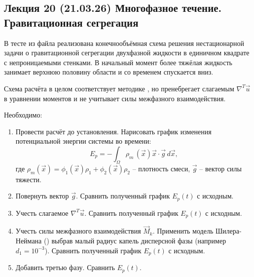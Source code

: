 \subsection{Лекция 20 (21.03.26) Многофазное течение. Гравитационная сегрегация}
В тесте \cvar{[gravity-mf]} из файла 
реализована конечнообъёмная схема решения нестационарной задачи
о гравитационной сегрегации двухфазной жидкости в единичном квадрате с непроницаемыми стенками.
В начальный момент более тяжёлая жидкость занимает верхнюю половину области и со временем спускается вниз.

Схема расчёта в целом соответствует методике , но пренебрегает слагаемым
$\nabla^T \vec u$ в уравнении моментов и не учитывает силы межфазного взаимодействия.

Необходимо:
\begin{enumerate}
\item  Провести расчёт до установления. Нарисовать график изменения потенциальной энергии системы во времени:
       \begin{equation*}
       E_p = -\int_\Omega \rho_m \, (\vec x) \vec x \cdot \vec g \, d\vec x,
       \end{equation*}
       где $\rho_m(\vec x) = \phi_1(\vec x) \rho_1 + \phi_2(\vec x) \rho_2$ -- плотность смеси, $\vec g$ -- вектор силы тяжести.
\item Повернуть вектор $\vec g$. Сравнить полученный график $E_p(t)$ с исходным. 
\item Учесть слагаемое $\nabla^T \vec u$. Сравнить полученный график $E_p(t)$ с исходным.
\item Учесть силы межфазного взаимодействия $\vec M_k$. Применить модель Шилера-Неймана () выбрав малый радиус капель дисперсной фазы (например $d_1 = 10^{-3}$). Сравнить полученный график $E_p(t)$ с исходным.
\item Добавить третью фазу. Сравнить $E_p(t)$.
\end{enumerate}

